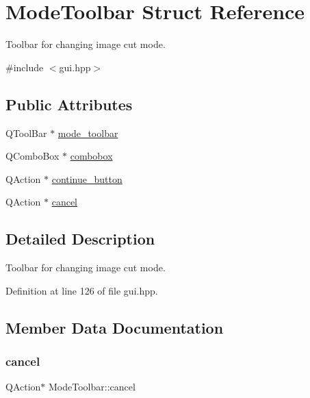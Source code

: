 \hypertarget{structModeToolbar}{}\section{Mode\+Toolbar Struct Reference}
\label{structModeToolbar}


Toolbar for changing image cut mode.  




{\ttfamily \#include $<$gui.\+hpp$>$}

\subsection*{Public Attributes}
\begin{DoxyCompactItemize}
\item 
Q\+Tool\+Bar $\ast$ \mbox{\hyperlink{structModeToolbar_acc6bcdd91825343f34ec38d312418234}{mode\+\_\+toolbar}}
\item 
Q\+Combo\+Box $\ast$ \mbox{\hyperlink{structModeToolbar_ad0ba4f03ef2a44e2543add404a50b4f1}{combobox}}
\item 
Q\+Action $\ast$ \mbox{\hyperlink{structModeToolbar_af7d7766f5b1710abb382c42689e963ca}{continue\+\_\+button}}
\item 
Q\+Action $\ast$ \mbox{\hyperlink{structModeToolbar_a814fa4aec4ff40543904dfc4aa4c8e89}{cancel}}
\end{DoxyCompactItemize}


\subsection{Detailed Description}
Toolbar for changing image cut mode. 

Definition at line 126 of file gui.\+hpp.



\subsection{Member Data Documentation}
\mbox{\label{structModeToolbar_a814fa4aec4ff40543904dfc4aa4c8e89}} 
\subsubsection{\texorpdfstring{cancel}{cancel}}
{\footnotesize\ttfamily Q\+Action$\ast$ Mode\+Toolbar\+::cancel}

